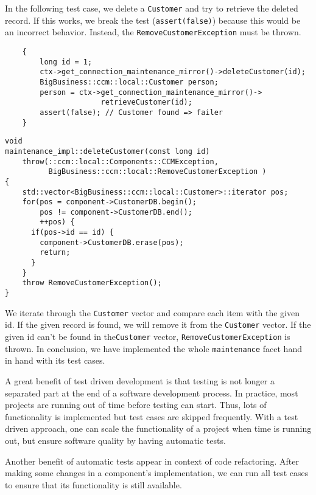 In the following test case, we delete a {\tt Customer} and try to retrieve the 
deleted record.
If this works, we break the test ({\tt assert(false)}) because this would be an
incorrect behavior. 
Instead, the {\tt RemoveCustomerException} must be thrown.
\begin{small}
\begin{verbatim}
    {
        long id = 1;
        ctx->get_connection_maintenance_mirror()->deleteCustomer(id);
        BigBusiness::ccm::local::Customer person;
        person = ctx->get_connection_maintenance_mirror()->
                      retrieveCustomer(id);
        assert(false); // Customer found => failer
    }
\end{verbatim}
\end{small}

\begin{small}
\begin{verbatim}
void
maintenance_impl::deleteCustomer(const long id)
    throw(::ccm::local::Components::CCMException,
          BigBusiness::ccm::local::RemoveCustomerException )
{
    std::vector<BigBusiness::ccm::local::Customer>::iterator pos;
    for(pos = component->CustomerDB.begin(); 
        pos != component->CustomerDB.end(); 
        ++pos) {
      if(pos->id == id) {
        component->CustomerDB.erase(pos);
        return;
      }
    }
    throw RemoveCustomerException();  
}
\end{verbatim}
\end{small}

We iterate through the {\tt Customer} vector and compare 
each item with the given id.
If the given record is found, we will remove it from the {\tt Customer} vector.
If the given id can't be found in the{\tt Customer} vector, 
{\tt RemoveCustomerException} is thrown.
In conclusion, we have implemented the whole {\tt maintenance} facet hand in 
hand with its test cases. 

\vspace{3mm}
A great benefit of test driven development is that testing is not longer a 
separated part at the end of a software development process.
In practice, most projects are running out of time before testing can start. 
Thus, lots of functionality is implemented but test cases are skipped 
frequently.
With a test driven approach, one can scale the functionality of a project when 
time is running out, but ensure software quality by having automatic tests.

Another benefit of automatic tests appear in context of code refactoring. 
After making some changes in a component's implementation, we can run all test 
cases to ensure that its functionality is still available.


